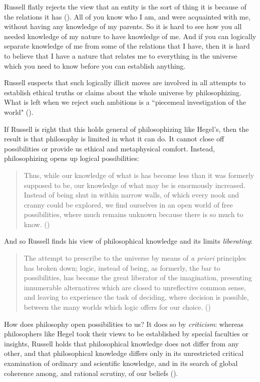 \documentclass[oneside,letterpaper,12pt]{book}
\begin{document}
Russell flatly rejects the view that an entity is the sort of thing it is because of the relations it has (\pageref{nature}). All of you know who I am, and were acquainted with me, without having any knowledge of my parents. So it is hard to see how you all needed knowledge of my nature to have knowledge of me. And if you can logically separate knowledge of me from some of the relations that I have, then it is hard to believe that I have a nature that relates me to everything in the universe which you need to know before you can establish anything.

Russell suspects that such logically illicit moves are involved in all attempts to establish ethical truths or claims about the whole universe by philosophizing. What is left when we reject such ambitions is a ``piecemeal investigation of the world" (\pageref{piecemeal}). 

If Russell is right that this holds general of philosophizing like Hegel's, then the result is that philosophy is limited in what it can do. It cannot close off possibilities or provide us ethical and metaphysical comfort. Instead, philosophizing opens up logical possibilities:
\begin{quote}
	Thus, while our knowledge of what is has become less than it was formerly supposed to be, our knowledge of what may be is enormously increased. Instead of being shut in within narrow walls, of which every nook and cranny could be explored, we find ourselves in an open world of free possibilities, where much remains unknown because there is so much to know. (\pageref{possibilities})
\end{quote} 
And so Russell finds his view of philosophical knowledge and its limits \textit{liberating}:
\begin{quote}
	The attempt to prescribe to the universe by means of \textit{a priori} principles has broken down; logic, instead of being, as formerly, the bar to possibilities, has become the great liberator of the imagination, presenting innumerable alternatives which are closed to unreflective common sense, and leaving to experience the task of deciding, where decision is possible, between the many worlds which logic offers for our choice. (\pageref{choice})
\end{quote}
How does philosophy open possibilities to us? It does so by \textit{criticism}: whereas philosophers like Hegel took their views to be established by special faculties or insights, Russell holds that philosophical knowledge does not differ from any other, and that philosophical knowledge differs only in its unrestricted critical examination of ordinary and scientific knowledge, and in its search of global coherence among, and rational scrutiny, of our beliefs (\pageref{criticism}).
\end{document}

